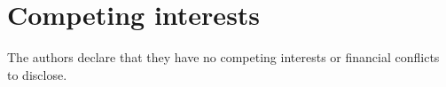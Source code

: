\section*{Competing interests}
The authors declare that they have no competing interests or financial conflicts to disclose.
